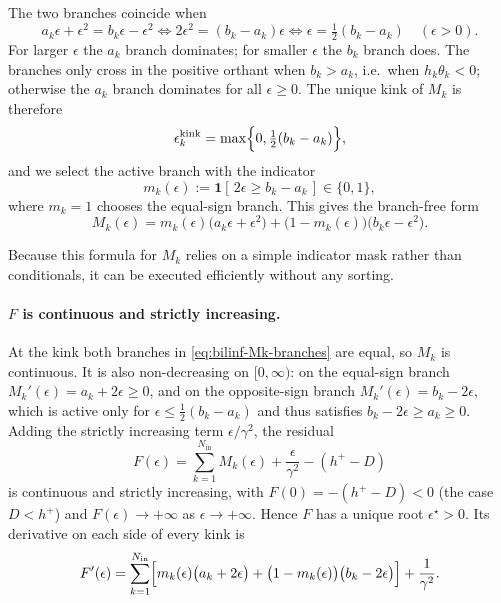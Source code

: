 The two branches coincide when
\[
  a_k\epsilon + \epsilon^2 = b_k\epsilon - \epsilon^2
  \Longleftrightarrow 2\epsilon^2 = (b_k - a_k)\epsilon
  \Longleftrightarrow \epsilon = \tfrac{1}{2}(b_k - a_k)
  \quad (\epsilon>0).
\]
For larger $\epsilon$ the $a_k$ branch dominates; for smaller $\epsilon$ the
$b_k$ branch does. The branches only cross in the positive orthant when
$b_k > a_k$, i.e.\ when $h_k\theta_k < 0$; otherwise the $a_k$ branch dominates for
all $\epsilon\ge 0$. The unique kink of $M_k$ is therefore
\[
  \epsilon_k^{\mathrm{kink}} = \max\Bigl\{0,\tfrac{1}{2}(b_k - a_k)\Bigr\},
\]
and we select the active branch with the indicator
\[
  m_k(\epsilon) := \mathbf{1}\!\left[\,2\epsilon \ge b_k - a_k\,\right] \in \{0,1\},
\]
where $m_k = 1$ chooses the equal-sign branch. This gives the branch-free form
\begin{equation}
\label{eq:bilinf-Mk-masked}
  M_k(\epsilon)
    = m_k(\epsilon)\bigl(a_k\epsilon+\epsilon^2\bigr)
        + \bigl(1-m_k(\epsilon)\bigr)\bigl(b_k\epsilon-\epsilon^2\bigr).
\end{equation}
\begin{tcolorbox}
Because this formula for $M_k$ relies on a simple indicator mask rather than conditionals, it can be executed efficiently without any sorting.
\end{tcolorbox}
\paragraph{$F$ is continuous and strictly increasing.}
At the kink both branches in \eqref{eq:bilinf-Mk-branches} are equal, so $M_k$ is
continuous. It is also non-decreasing on $[0,\infty)$: on the equal-sign branch
$M_k'(\epsilon) = a_k + 2\epsilon \ge 0$, and on the opposite-sign branch
$M_k'(\epsilon) = b_k - 2\epsilon$, which is active only for
$\epsilon \le \tfrac{1}{2}(b_k-a_k)$ and thus satisfies $b_k - 2\epsilon \ge a_k \ge 0$.
Adding the strictly increasing term $\epsilon/\gamma^2$, the residual
\[
  F(\epsilon) = \sum_{k=1}^{N_\mathrm{in}} M_k(\epsilon) + \frac{\epsilon}{\gamma^2} - (h^{+} - D)
\]
is continuous and strictly increasing, with $F(0) = -(h^{+}-D) < 0$ (the case
$D < h^{+}$) and $F(\epsilon)\to+\infty$ as $\epsilon\to+\infty$. Hence $F$ has a unique root $\epsilon^\star > 0$.
Its derivative on each side of every kink is
\begin{equation}
  F'(\epsilon)
    = \sum_{k=1}^{N_\mathrm{in}}\Bigl[
        m_k(\epsilon)\bigl(a_k + 2\epsilon\bigr)
      + \bigl(1-m_k(\epsilon)\bigr)\bigl(b_k - 2\epsilon\bigr)
    \Bigr] + \frac{1}{\gamma^2}.
\end{equation}

